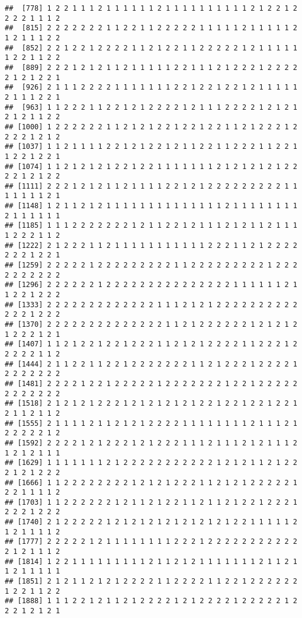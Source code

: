 \documentclass[
]{article}
\begin{document}
\begin{verbatim}
##  [778] 1 2 2 1 1 1 2 1 1 1 1 1 1 2 1 1 1 1 1 1 1 1 1 1 2 1 2 2 1 2 2 2 2 1 1 1 2
##  [815] 2 2 2 2 2 2 2 1 1 2 2 1 1 2 2 2 2 2 1 1 1 1 1 2 1 1 1 1 1 2 1 2 1 1 1 2 2
##  [852] 2 2 1 2 2 1 2 2 2 2 1 1 2 1 2 2 1 1 2 2 2 2 2 1 2 1 1 1 1 1 1 2 2 1 1 2 2
##  [889] 2 2 2 1 2 1 2 1 1 2 1 1 1 1 1 2 2 1 1 1 2 1 2 2 2 1 2 2 2 2 2 1 2 1 2 2 1
##  [926] 2 1 1 1 2 2 2 2 1 1 1 1 1 1 1 2 2 1 2 2 1 2 2 1 2 1 1 1 1 1 2 1 1 1 2 2 1
##  [963] 1 1 2 2 2 1 1 2 2 1 2 1 2 2 2 2 1 2 1 1 1 2 2 2 2 1 2 1 2 1 2 1 2 1 1 2 2
## [1000] 1 2 2 2 2 2 2 1 1 2 1 2 1 2 2 1 2 2 1 2 2 1 1 2 1 2 2 2 1 2 2 2 2 1 2 1 2
## [1037] 1 1 2 1 1 1 1 2 2 1 2 1 2 2 1 2 1 1 2 2 1 1 2 2 2 1 1 2 2 1 1 2 2 1 2 2 1
## [1074] 1 1 2 1 2 1 2 1 2 2 1 2 2 1 1 1 1 1 1 1 2 1 2 1 2 1 2 1 2 2 2 2 1 2 1 2 2
## [1111] 2 2 2 1 2 1 2 1 1 2 1 1 1 1 2 2 1 2 1 2 2 2 2 2 2 2 2 2 1 1 1 1 1 1 1 2 1
## [1148] 1 2 1 1 2 1 2 1 1 1 1 1 1 1 1 1 1 1 1 1 1 2 1 1 1 1 1 1 1 1 2 1 1 1 1 1 1
## [1185] 1 1 1 2 2 2 2 2 2 2 1 2 1 1 2 2 1 2 1 1 1 2 1 2 1 1 2 1 1 1 1 2 2 2 1 1 2
## [1222] 2 1 2 2 2 1 1 2 1 1 1 1 1 1 1 1 1 1 1 2 2 2 1 1 2 1 2 2 2 2 2 2 2 1 2 2 1
## [1259] 2 2 2 2 2 1 2 2 2 2 2 2 2 2 2 1 1 2 2 2 2 2 2 2 2 2 1 2 2 2 2 2 2 2 2 2 2
## [1296] 2 2 2 2 2 2 1 2 2 2 2 2 2 2 2 2 2 2 2 2 2 2 1 1 1 1 1 1 2 1 1 2 2 1 2 2 2
## [1333] 2 2 2 2 2 2 2 2 2 2 2 2 2 1 1 1 2 1 2 1 2 2 2 2 2 2 2 2 2 2 2 2 2 1 2 2 2
## [1370] 2 2 2 2 2 2 2 2 2 2 2 2 2 2 1 1 2 1 2 2 2 2 2 2 1 2 1 2 1 2 1 2 2 2 1 2 1
## [1407] 1 1 2 1 2 2 1 2 2 1 2 2 2 1 1 2 1 2 1 2 2 2 2 1 1 2 2 2 1 2 2 2 2 2 1 1 2
## [1444] 2 1 1 2 2 1 1 2 2 1 2 2 2 2 2 2 2 1 1 2 1 2 2 2 1 2 2 2 2 1 2 2 2 2 2 2 2
## [1481] 2 2 2 2 1 2 2 1 2 2 2 2 2 1 2 2 2 2 2 2 2 1 2 2 1 2 2 2 2 2 2 2 2 2 2 2 2
## [1518] 2 1 2 1 2 1 2 2 2 1 2 1 2 1 2 1 2 1 2 2 1 2 2 1 2 2 1 2 2 1 2 1 1 2 1 1 2
## [1555] 2 1 1 1 1 2 1 1 2 1 2 1 2 2 2 2 1 1 1 1 1 1 1 1 2 1 1 1 2 1 2 2 2 2 2 1 2
## [1592] 2 2 2 2 1 2 1 2 2 2 1 2 1 2 2 2 1 1 1 2 1 1 1 2 1 2 1 1 1 2 1 2 1 2 1 1 1
## [1629] 1 1 1 1 1 1 1 2 1 2 2 2 2 2 2 2 2 2 2 2 1 2 1 2 1 1 2 1 2 2 2 1 2 1 2 2 2
## [1666] 1 1 2 2 2 2 2 2 2 2 1 2 1 2 1 2 2 2 1 1 2 1 2 1 2 2 2 2 2 1 2 2 1 1 1 1 2
## [1703] 1 1 2 2 2 2 2 2 1 2 1 1 2 1 2 2 1 1 2 1 1 2 1 2 2 1 2 2 2 1 2 2 2 1 2 2 2
## [1740] 2 1 2 2 2 2 2 1 2 1 2 1 2 1 2 1 2 1 2 1 2 1 2 2 1 1 1 1 1 2 1 2 1 1 1 1 2
## [1777] 2 2 2 2 2 1 2 1 1 1 1 1 1 1 1 2 2 2 1 2 2 2 2 2 2 2 2 2 2 2 2 1 2 1 1 1 2
## [1814] 1 2 2 1 1 1 1 1 1 1 1 1 2 1 1 2 1 2 1 1 1 1 1 1 1 2 1 1 2 1 1 2 1 1 1 1 1
## [1851] 2 1 2 1 1 2 1 2 1 2 2 2 2 1 1 2 2 2 2 1 1 2 2 1 2 2 2 2 2 2 1 2 2 1 1 2 2
## [1888] 1 1 1 2 2 1 2 1 1 2 1 2 2 2 2 1 2 1 2 2 2 2 1 2 2 2 2 2 1 2 2 2 1 2 1 2 1

\end{verbatim}
\end{document}
